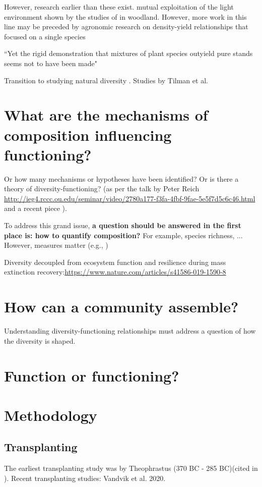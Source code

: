 \documentclass[letterpaper, 10pt]{article}
\begin{document}
However, research earlier than these exist. mutual exploitation of the light environment shown by the studies of \citet{salisbury1916oak} in woodland. However, more work in this line may be preceded by agronomic research on density-yield relationships that focused on a single species \citep{harperdarwinian} 

``Yet the rigid demonstration that mixtures of plant species outyield pure stands seems not to have been made" \citep{harperdarwinian}

Transition to studying natural diversity \citep{levin1999fragile}. Studies by Tilman et al. 


\section{What are the mechanisms of composition influencing functioning?}
Or how many mechanisms or hypotheses have been identified? Or is there a theory of diversity-functioning? (as per the talk by Peter Reich \url{http://ieg4.rccc.ou.edu/seminar/video/2780a177-f3fa-4fbf-9fae-5e5f7d5c6c46.html} and a recent piece \citep{dunn2019biodiversity}). 

To address this grand issue, \textbf{a question should be answered in the first place is: how to quantify composition?} For example, species richness, ... However, measures matter (e.g., \citealp{schuldt2017belowground})


Diversity decoupled from ecosystem function and resilience during mass extinction recovery:\url{https://www.nature.com/articles/s41586-019-1590-8}


\section{How can a community assemble?}
Understanding diversity-functioning relationships must address a question of how the diversity is shaped.

\section{Function or functioning?}
\citep{jax2005function}

\section{Methodology}

\subsection{Transplanting}
The earliest transplanting study was by Theophrastus (370 BC - 285 BC)(cited in \citet{woodward1987climate}). Recent transplanting studies: Vandvik et al. 2020\citep{vandvik2020biotic}.
\end{document}
